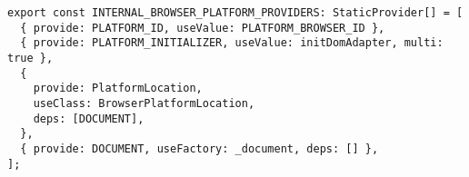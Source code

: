 \begin{verbatim}
export const INTERNAL_BROWSER_PLATFORM_PROVIDERS: StaticProvider[] = [
  { provide: PLATFORM_ID, useValue: PLATFORM_BROWSER_ID },
  { provide: PLATFORM_INITIALIZER, useValue: initDomAdapter, multi: true },
  {
    provide: PlatformLocation,
    useClass: BrowserPlatformLocation,
    deps: [DOCUMENT],
  },
  { provide: DOCUMENT, useFactory: _document, deps: [] },
];
\end{verbatim}
